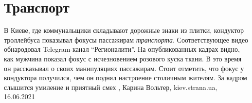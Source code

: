  
 
 
 
 
\chapter{Транспорт}
\label{sec:slova.transport}

В Киеве, где коммунальщики складывают дорожные знаки из плитки, кондуктор
троллейбуса показывал фокусы пассажирам \emph{транспорта}.  Соответствующее видео
обнародовал Telegram-канал \enquote{Регионалити}.  На опубликованных кадрах видно, как
мужчина показал фокус с исчезновением розового куска ткани. В это время он
рассказывал о своих манипуляциях пассажирам. Стоит отметить, что фокус у
кондуктора получился, чем он поднял настроение столичным жителям. За кадром
слышится умиление и приятный смех
, 
Карина Вольтер, kiev.strana.ua, 16.06.2021

